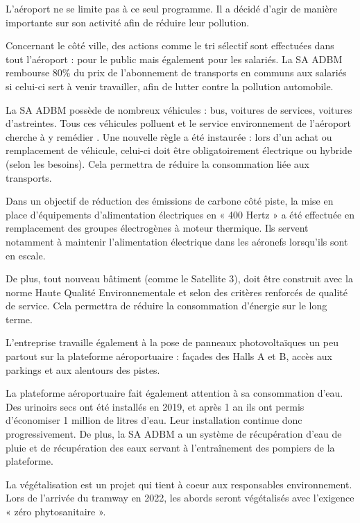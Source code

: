 L'aéroport ne se limite pas à ce seul programme. Il a décidé d'agir de manière importante sur son activité afin de réduire leur pollution.


Concernant le côté ville, des actions comme le tri sélectif sont effectuées dans tout l'aéroport : pour le public mais également pour les salariés. La SA ADBM rembourse 80\% du prix de l'abonnement de transports en communs aux salariés si celui-ci sert à venir travailler, afin de lutter contre la pollution automobile.


La SA ADBM possède de nombreux véhicules : bus, voitures de services, voitures d'astreintes. Tous ces véhicules polluent et le service environnement de l'aéroport cherche à y remédier . Une nouvelle règle a été instaurée : lors d'un achat ou remplacement de véhicule, celui-ci doit être obligatoirement électrique ou hybride (selon les besoins). Cela permettra de réduire la consommation liée aux transports.\newline


Dans un objectif de réduction des émissions de carbone côté piste, la mise en place d’équipements d’alimentation électriques en « 400 Hertz » a été effectuée en remplacement des groupes électrogènes à moteur thermique. Ils servent notamment à maintenir l'alimentation électrique dans les aéronefs lorsqu'ils sont en escale.


De plus, tout nouveau bâtiment (comme le Satellite 3), doit être construit avec la norme Haute Qualité Environnementale et selon des critères renforcés de qualité de service. Cela permettra de réduire la consommation d'énergie sur le long terme.\newline


L'entreprise travaille également à la pose de panneaux photovoltaïques un peu partout sur la plateforme aéroportuaire : façades des Halls A et B, accès aux parkings et aux alentours des pistes.\newline


La plateforme aéroportuaire fait également attention à sa consommation d'eau. Des urinoirs secs ont été installés en 2019, et après 1 an ils ont permis d'économiser 1 million de litres d'eau. Leur installation continue donc progressivement.
De plus, la SA ADBM a un système de récupération d'eau de pluie et de récupération des eaux servant à l'entraînement des pompiers de la plateforme.\newline


La végétalisation est un projet qui tient à coeur aux responsables environnement. Lors de l'arrivée du tramway en 2022, les abords seront végétalisés avec l'exigence « zéro phytosanitaire ».\newline



